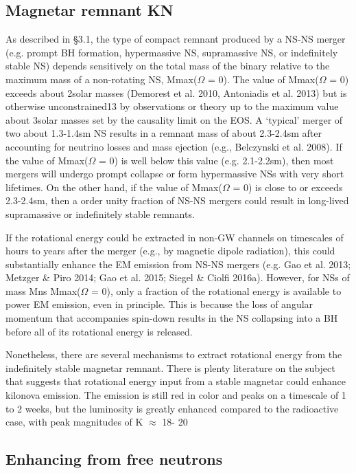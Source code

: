 \subsection{Magnetar remnant KN}

As described in §3.1, the type of compact remnant produced by a NS-NS merger (e.g. prompt BH formation, hypermassive NS, supramassive NS, or indefinitely stable NS) depends sensitively on the total mass of the binary relative to the maximum mass of a non-rotating NS, Mmax($\Omega$ = 0). The value of Mmax($\Omega$ = 0) exceeds about 2solar masses (Demorest et al. 2010, Antoniadis et al. 2013) but is otherwise unconstrained13 by observations or theory up to the maximum value about 3solar masses set by the causality limit on the EOS. A `typical' merger of two about 1.3-1.4sm NS results in a remnant mass of about 2.3-2.4sm after accounting for neutrino losses and mass ejection (e.g., Belczynski et al. 2008). If the value of Mmax($\Omega$ = 0) is well below this value (e.g. 2.1-2.2sm), then most mergers will undergo prompt collapse or form hypermassive NSs with very short lifetimes. On the other hand, if the value of Mmax($\Omega$ = 0) is close to or exceeds 2.3-2.4sm, then a order unity fraction of NS-NS mergers could result in long-lived supramassive or indefinitely stable remnants.

If the rotational energy could be extracted in non-GW channels on timescales of hours to years after the merger (e.g., by magnetic dipole radiation), this could substantially enhance the EM emission from NS-NS mergers (e.g. Gao et al. 2013; Metzger \& Piro 2014; Gao et al. 2015; Siegel \& Ciolfi 2016a). However, for NSs of mass Mns   Mmax($\Omega$ = 0), only a fraction of the rotational energy is available to power EM emission, even in principle. This is because the loss of angular momentum that accompanies spin-down results in the NS collapsing into a BH before all of its rotational energy is released.

Nonetheless, there are several mechanisms to extract rotational energy from the indefinitely stable magnetar remnant.
There is plenty literature on the subject that suggests that rotational energy input from a stable magnetar could enhance kilonova emission. The emission is still red in color and peaks on a timescale of 1 to 2 weeks, but the luminosity is greatly enhanced compared to the radioactive case, with peak magnitudes of K $\approx$ 18- 20

\subsection{Enhancing from free neutrons}


